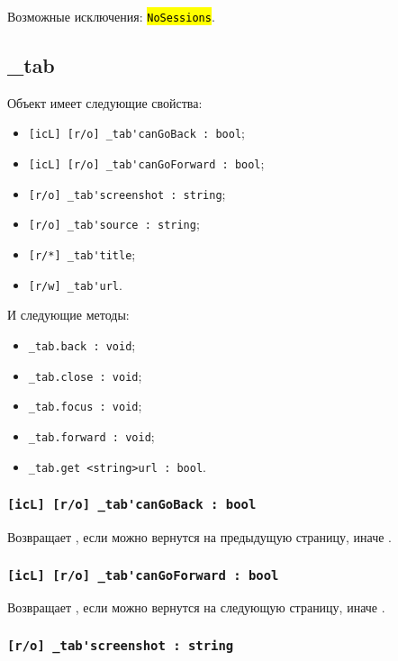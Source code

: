 \documentclass[a4paper, 14pt]{extarticle}
\newcommand{\ferror}[1]{\foreignlanguage{english}{\fontsize{11pt}{12pt}\tt{\sethlcolor{yellow}\hl{#1}}}}
\newenvironment{icItems}
	{ \begin{itemize} [noitemsep,nolistsep] }
	{ \end{itemize} }
\begin{document}
Возможные исключения: \ferror{NoSessions}.

\subsection{{\color{orange} \_tab}}

Объект \tab{} имеет следующие свойства:
\begin{icItems}
	\item \lstinline|[icL] [r/o] _tab'canGoBack : bool|;
	\item \lstinline|[icL] [r/o] _tab'canGoForward : bool|;
	\item \lstinline|[r/o] _tab'screenshot : string|;
	\item \lstinline|[r/o] _tab'source : string|;
	\item \lstinline|[r/*] _tab'title|;
	\item \lstinline|[r/w] _tab'url|.
\end{icItems}

И следующие методы:
\begin{icItems}
	\item \lstinline|_tab.back : void|;
	\item \lstinline|_tab.close : void|;
	\item \lstinline|_tab.focus : void|;
	\item \lstinline|_tab.forward : void|;
	\item \lstinline|_tab.get <string>url : bool|.
\end{icItems}

\subsubsection{\lstinline|[icL] [r/o] _tab'canGoBack : bool|}

Возвращает \true, если можно вернутся на предыдущую страницу, иначе \false.

\subsubsection{\lstinline|[icL] [r/o] _tab'canGoForward : bool|}

Возвращает \true, если можно вернутся на следующую страницу, иначе \false.

\subsubsection{\lstinline|[r/o] _tab'screenshot : string|}
\end{document}

